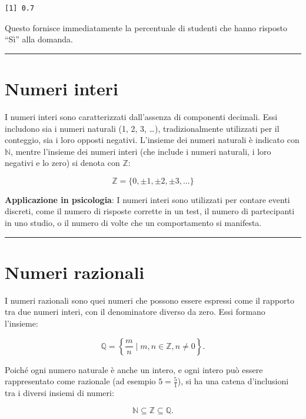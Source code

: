 \documentclass[
  italian,
  letterpaper,
  a4paper,
  11pt,
  open=any]{scrbook}
\theoremstyle{plain}
\theoremstyle{definition}
\theoremstyle{definition}
\theoremstyle{remark}
\begin{document}
\begin{verbatim}
[1] 0.7
\end{verbatim}

Questo fornisce immediatamente la percentuale di studenti che hanno
risposto ``Sì'' alla domanda.

\begin{center}\rule{0.5\linewidth}{0.5pt}\end{center}

\section{Numeri interi}\label{numeri-interi}

I numeri interi sono caratterizzati dall'assenza di componenti decimali.
Essi includono sia i numeri naturali (1, 2, 3, \ldots), tradizionalmente
utilizzati per il conteggio, sia i loro opposti negativi. L'insieme dei
numeri naturali è indicato con \(\mathbb{N}\), mentre l'insieme dei
numeri interi (che include i numeri naturali, i loro negativi e lo zero)
si denota con \(\mathbb{Z}\):

\[
\mathbb{Z} = \{0, \pm 1, \pm 2, \pm 3, \dots\}
\]

\textbf{Applicazione in psicologia}: I numeri interi sono utilizzati per
contare eventi discreti, come il numero di risposte corrette in un test,
il numero di partecipanti in uno studio, o il numero di volte che un
comportamento si manifesta.

\begin{center}\rule{0.5\linewidth}{0.5pt}\end{center}

\section{Numeri razionali}\label{numeri-razionali}

I numeri razionali sono quei numeri che possono essere espressi come il
rapporto tra due numeri interi, con il denominatore diverso da zero.
Essi formano l'insieme:

\[
\mathbb{Q} = \left\{\frac{m}{n} \mid m,n \in \mathbb{Z}, n \neq 0\right\}.
\]

Poiché ogni numero naturale è anche un intero, e ogni intero può essere
rappresentato come razionale (ad esempio \(5 = \frac{5}{1}\)), si ha una
catena d'inclusioni tra i diversi insiemi di numeri:

\[
\mathbb{N} \subseteq \mathbb{Z} \subseteq \mathbb{Q}.
\]
\end{document}
